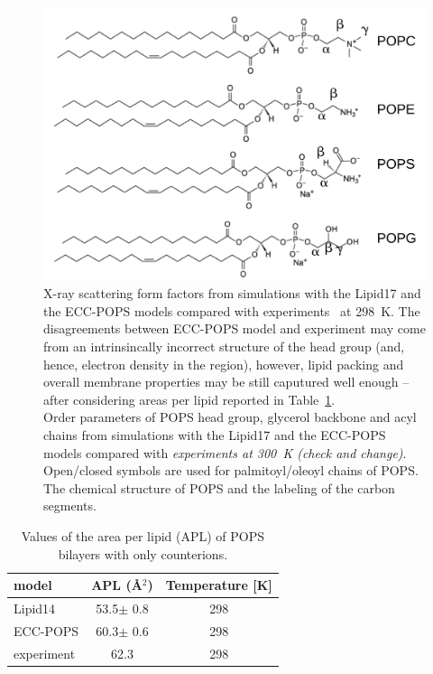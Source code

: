 \documentclass[journal=jpcbfk,manuscript=article]{achemso}
\newlength{\figwidth}
\begin{document}
\begin{figure}[tb!]
  \includegraphics[width=0.55 \figwidth]{../Fig/lipids_chemfig.pdf} 
  \caption{\label{simVSexpNOions} 
    X-ray scattering form factors from simulations with the Lipid17 \cite{lipid17-future} and 
    the ECC-POPS models compared with experiments~\cite{SDP-CHARMM36_comparison_paper_Samuli-knows} at 298~K. 
    The disagreements between ECC-POPS model and experiment 
    may come from an intrinsincally incorrect structure of the head group (and, hence, electron density in the region), 
    however, lipid packing and overall membrane properties 
    may be still caputured well enough -- after considering areas per lipid reported in Table~\ref{tab:apls}.  \\
    Order parameters of POPS head group, glycerol backbone and acyl chains  
    from simulations with the Lipid17 \cite{lipid17-future} and the ECC-POPS models 
    compared with \emph{experiments at 300~K (check and change)}. 
    Open/closed symbols are used for palmitoyl/oleoyl chains of POPS. \\
    The chemical structure of POPS and the labeling of the carbon segments. 
  }  
\end{figure} 
 
\begin{table}[tb!] 
  \caption{Values of the area per lipid (APL) of POPS bilayers with only  counterions. \label{tab:apls} 
  } 
  \begin{tabular}{l|c c} 
    model          & APL (\AA$^2$)   & Temperature [K] \\ 
    \hline 
    Lipid14                   & 53.5$\pm$ 0.8  &  298 \\ 
    \hline 
    ECC-POPS                & 60.3$\pm$ 0.6  &  298       \\ 
    \hline 
    experiment \cite{SDP-CHARMM36_comparison_paper_Samuli-knows} & 62.3  &  298    \\ 
    \hline 
  \end{tabular} 
\end{table} 
 
\end{document}
